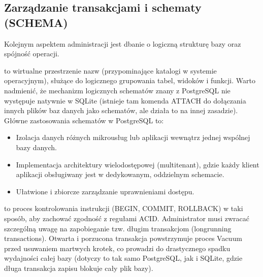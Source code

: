 \documentclass[a4paper,11pt,english,openany,oneside]{sphinxmanual}
\begin{document}
\subsection{Zarządzanie transakcjami i schematy (SCHEMA)}
\label{\detokenize{rozdzial_2/rozdzial_23/index:zarzadzanie-transakcjami-i-schematy-schema}}
\sphinxAtStartPar
Kolejnym aspektem administracji jest dbanie o logiczną strukturę bazy oraz spójność operacji.

\sphinxAtStartPar
{} to wirtualne przestrzenie nazw (przypominające katalogi w systemie operacyjnym), służące do logicznego grupowania tabel, widoków i funkcji. Warto nadmienić, że mechanizm logicznych schematów znany z PostgreSQL nie występuje natywnie w SQLite (istnieje tam komenda ATTACH do dołączania innych plików baz danych jako schematów, ale działa to na innej zasadzie). Główne zastosowania schematów w PostgreSQL to:
\begin{itemize}
\item {} 
\sphinxAtStartPar
Izolacja danych różnych mikrousług lub aplikacji wewnątrz jednej wspólnej bazy danych.

\item {} 
\sphinxAtStartPar
Implementacja architektury wielodostępowej (multi\sphinxhyphen{}tenant), gdzie każdy klient aplikacji obsługiwany jest w dedykowanym, oddzielnym schemacie.

\item {} 
\sphinxAtStartPar
Ułatwione i zbiorcze zarządzanie uprawnieniami dostępu.

\end{itemize}

\sphinxAtStartPar
{} to proces kontrolowania instrukcji (BEGIN, COMMIT, ROLLBACK) w taki sposób, aby zachować zgodność z regułami ACID. Administrator musi zwracać szczególną uwagę na zapobieganie tzw. długim transakcjom (long\sphinxhyphen{}running transactions). Otwarta i porzucona transakcja powstrzymuje proces Vacuum przed usuwaniem martwych krotek, co prowadzi do drastycznego spadku wydajności całej bazy (dotyczy to tak samo PostgreSQL, jak i SQLite, gdzie długa transakcja zapisu blokuje cały plik bazy).

\begin{sphinxVerbatim}[commandchars=\\\{\}]
\end{sphinxVerbatim}
\end{document}
